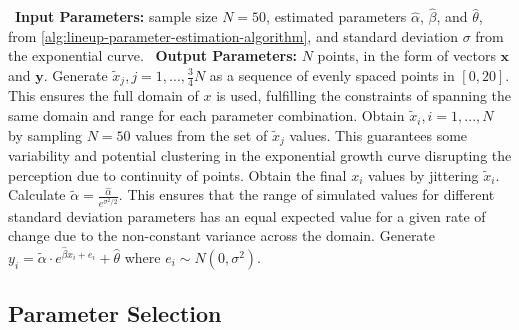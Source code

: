\documentclass[12pt]{article}
\begin{document}
\begin{algorithm}
  \caption{Lineup Exponential Data Simulation}\label{alg:lineup-exponential-data-simulation-algorithm}
  \begin{algorithmic}[1]
    \Statex \hspace*{-1em}\textbullet~\textbf{Input Parameters:} sample size $N = 50$, estimated parameters $\hat\alpha$, $\hat\beta$, and $\hat\theta$, from \cref{alg:lineup-parameter-estimation-algorithm}, and standard deviation $\sigma$ from the exponential curve.
    \Statex \hspace*{-1em}\textbullet~\textbf{Output Parameters:} $N$ points, in the form of vectors $\mathbf{x}$ and $\mathbf{y}$.
    \State Generate $\tilde x_j, j = 1,..., \frac{3}{4}N$ as a sequence of evenly spaced points in $[0,20]$. This ensures the full domain of $x$ is used, fulfilling the constraints of spanning the same domain and range for each parameter combination.
    \State Obtain $\tilde x_i, i = 1,...,N$ by sampling $N = 50$ values from the set of $\tilde x_j$ values. This guarantees some variability and potential clustering in the exponential growth curve disrupting the perception due to continuity of points.
    \State Obtain the final $x_i$ values by jittering $\tilde x_i$.
    \State Calculate $\tilde\alpha = \frac{\hat\alpha}{e^{\sigma^2/2}}.$ This ensures that the range of simulated values for different standard deviation parameters has an equal expected value for a given rate of change due to the non-constant variance across the domain.
    \State Generate $y_i = \tilde\alpha\cdot e^{\hat\beta x_i + e_i}+\hat\theta$ where $e_i\sim N(0,\sigma^2).$
  \end{algorithmic}
\end{algorithm}

\hypertarget{lineups-parameter-selection}{%
\subsection{Parameter Selection}\label{lineups-parameter-selection}}
\end{document}
